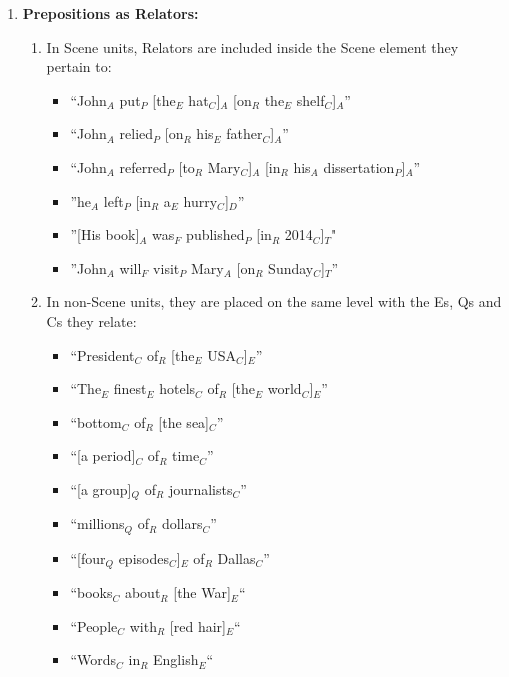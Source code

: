 \documentclass[11pt]{article}
\newcommand{\dd}[1]{{\color{blue}{#1}}}
\newcommand{\oa}[1]{{\color{blue}{OA: #1}}}
\newcommand{\nss}[1]{}
\begin{document}
\begin{enumerate}
   
\item
{\bf Prepositions as Relators:}
\begin {enumerate} 
\item
In Scene units, Relators are included inside the Scene element they pertain to: 
\begin {itemize}
	\item
	``John$_A$ put$_P$ [the$_E$ hat$_C$]$_A$ [on$_R$ the$_E$ shelf$_C$]$_A$''
	\item
	``John$_A$ relied$_P$ [on$_R$ his$_E$ father$_C$]$_A$''
	\item
	``John$_A$ referred$_P$ [to$_R$ Mary$_C$]$_A$ [in$_R$ his$_A$ dissertation$_P$]$_A$''
    \item
    ''he$_A$ left$_P$ [in$_R$ a$_E$ hurry$_C$]$_D$''
    \item
    ''[His book]$_A$ was$_F$ published$_P$ [in$_R$ 2014$_C$]$_T$"
    \item
    ''John$_A$ will$_F$ visit$_P$ Mary$_A$ [on$_R$ Sunday$_C$]$_T$''
\end {itemize}

\item  In non-Scene units, they are placed on the same level with the Es, Qs and Cs they relate:
    \begin{itemize}
	\item
	``President$_C$ of$_R$ [the$_E$ USA$_C$]$_E$''
	\item
	``The$_E$ finest$_E$ hotels$_C$ of$_R$ [the$_E$ world$_C$]$_E$''
	\item
	``bottom$_C$ of$_R$ [the sea]$_C$''
	\item
	``[a period]$_C$ of$_R$ time$_C$''
	\item	
	``[a group]$_Q$ of$_R$ journalists$_C$''
	\item
	``millions$_Q$ of$_R$ dollars$_C$''
	\item 
	``[four$_Q$ episodes$_C$]$_E$ of$_R$ Dallas$_C$''
    \item
    ``books$_C$ about$_R$ [the War]$_E$``
    \item
    ``People$_C$ with$_R$ [red hair]$_E$``
    \item 
    ``Words$_C$ in$_R$ English$_E$``
  
    
\end {itemize}
\end{enumerate}


\end{enumerate}
\end{document}
